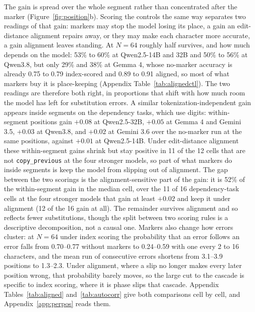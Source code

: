\documentclass[10pt]{article} %
\newcommand{\task}[1]{\texttt{#1}}
\begin{document}
The gain is spread over the whole segment rather than concentrated after the marker (Figure~\ref{fig:position}b). Scoring the controls the same way separates two readings of that gain: markers may stop the model losing its place, a gain an edit-distance alignment repairs away, or they may make each character more accurate, a gain alignment leaves standing. At $N = 64$ roughly half survives, and how much depends on the model: 53\% to 60\% at Qwen2.5-14B and 32B and 50\% to 56\% at Qwen3.8, but only 29\% and 38\% at Gemma 4, whose no-marker accuracy is already 0.75 to 0.79 index-scored and 0.89 to 0.91 aligned, so most of what markers buy it is place-keeping (Appendix Table~\ref{tab:alignedctl}). The two readings are therefore both right, in proportions that shift with how much room the model has left for substitution errors. A similar tokenization-independent gain appears inside segments on the dependency tasks, which use digits: within-segment positions gain $+0.08$ at Qwen2.5-32B, $+0.05$ at Gemma 4 and Gemini 3.5, $+0.03$ at Qwen3.8, and $+0.02$ at Gemini 3.6 over the no-marker run at the same positions, against $+0.01$ at Qwen2.5-14B. Under edit-distance alignment these within-segment gains shrink but stay positive in 11 of the 12 cells that are not \task{copy\_previous} at the four stronger models, so part of what markers do inside segments is keep the model from slipping out of alignment. The gap between the two scorings is the alignment-sensitive part of the gain: it is 52\% of the within-segment gain in the median cell, over the 11 of 16 dependency-task cells at the four stronger models that gain at least $+0.02$ and keep it under alignment (12 of the 16 gain at all). The remainder survives alignment and so reflects fewer substitutions, though the split between two scoring rules is a descriptive decomposition, not a causal one. Markers also change how errors cluster: at $N = 64$ under index scoring the probability that an error follows an error falls from 0.70--0.77 without markers to 0.24--0.59 with one every 2 to 16 characters, and the mean run of consecutive errors shortens from 3.1--3.9 positions to 1.3--2.3. Under alignment, where a slip no longer makes every later position wrong, that probability barely moves, so the large cut to the cascade is specific to index scoring, where it is phase slips that cascade. Appendix Tables~\ref{tab:aligned} and~\ref{tab:autocorr} give both comparisons cell by cell, and Appendix~\ref{app:perpos} reads them. 
\end{document}
